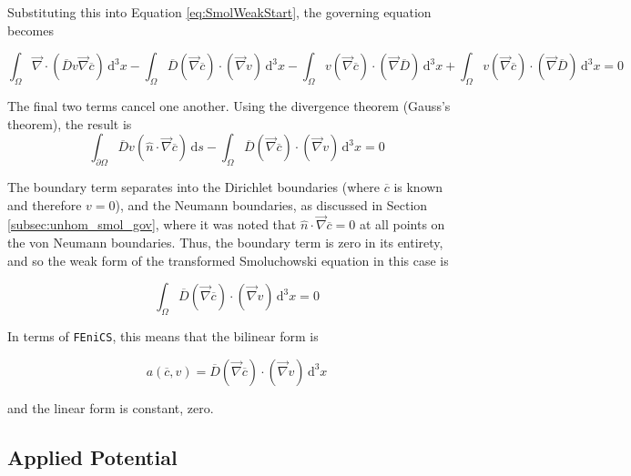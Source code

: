 Substituting this into Equation \ref{eq:SmolWeakStart},
the governing equation becomes

\begin{equation}
\int_{\Omega} \vec{\nabla} \cdot \left( \overline{D} v \vec{\nabla} \overline{c} \right) \,\mathrm{d}^3x
- \int_{\Omega} \overline{D} \left(\vec{\nabla}\overline{c}\right) \cdot \left(\vec{\nabla}v\right)\,\mathrm{d}^3x
- \int_{\Omega} v \left(\vec{\nabla}\overline{c}\right) \cdot \left(\vec{\nabla}\overline{D}\right) \,\mathrm{d}^3x
+ \int_{\Omega} v \left( \vec{\nabla} \overline{c} \right) \cdot \left( \vec{\nabla} \overline{D} \right) \,\mathrm{d}^3x = 0
\end{equation}

The final two terms cancel one another.
Using the divergence theorem (Gauss's theorem), the result is
\begin{equation}
\int_{\partial\Omega} \overline{D} v \left(\hat{n} \cdot \vec{\nabla}\overline{c}\right) \,\mathrm{d}s
- \int_{\Omega} \overline{D} \left(\vec{\nabla}\overline{c}\right) \cdot \left(\vec{\nabla}v\right)\,\mathrm{d}^3x
= 0
\end{equation}

The boundary term separates into the Dirichlet boundaries (where $\overline{c}$ is known and therefore $v=0$),
and the Neumann boundaries, as discussed in Section \ref{subsec:unhom_smol_gov},
where it was noted that $\hat{n} \cdot \vec{\nabla} \overline{c} = 0$ at all points on the von Neumann boundaries.
Thus, the boundary term is zero in its entirety,
and so the weak form of the transformed Smoluchowski equation in this case is

\begin{equation}
\int_{\Omega} \overline{D} \left(\vec{\nabla}\overline{c}\right) \cdot \left(\vec{\nabla}v\right)\,\mathrm{d}^3x = 0
\end{equation}

In terms of \texttt{FEniCS}, this means that the bilinear form is

\begin{equation}
a(\overline{c},v)= \overline{D} \left(\vec{\nabla}\overline{c}\right) \cdot \left(\vec{\nabla}v\right)\,\mathrm{d}^3x
\end{equation}

and the linear form is constant, zero.


\subsection{Applied Potential}\label{subsec:unhom_smol_potential}

